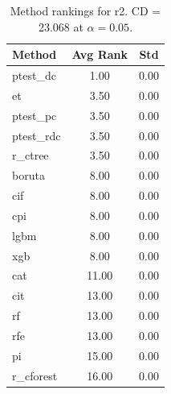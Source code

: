 \begin{table}[h]
\centering
\caption{Method rankings for r2. CD = 23.068 at $\alpha=0.05$.}
\label{tab:ranks_r2}
\begin{tabular}{lcc}
\toprule
Method & Avg Rank & Std \\
\midrule
ptest_dc & 1.00 & 0.00 \\
et & 3.50 & 0.00 \\
ptest_pc & 3.50 & 0.00 \\
ptest_rdc & 3.50 & 0.00 \\
r_ctree & 3.50 & 0.00 \\
boruta & 8.00 & 0.00 \\
cif & 8.00 & 0.00 \\
cpi & 8.00 & 0.00 \\
lgbm & 8.00 & 0.00 \\
xgb & 8.00 & 0.00 \\
cat & 11.00 & 0.00 \\
cit & 13.00 & 0.00 \\
rf & 13.00 & 0.00 \\
rfe & 13.00 & 0.00 \\
pi & 15.00 & 0.00 \\
r_cforest & 16.00 & 0.00 \\
\bottomrule
\end{tabular}
\end{table}